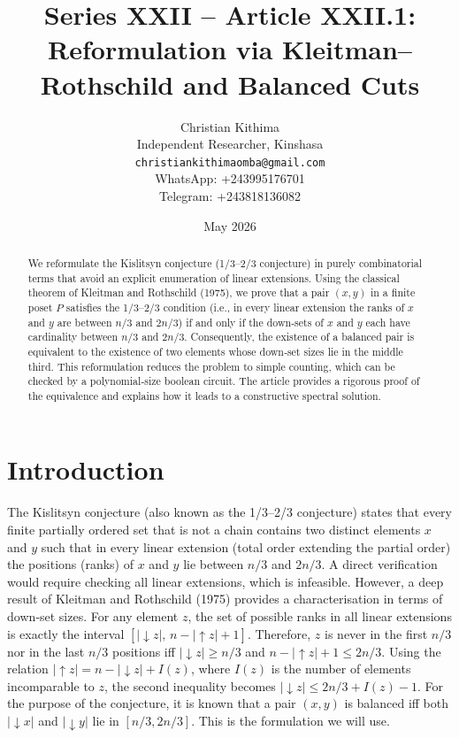 \documentclass[11pt,a4paper]{article}
\title{Series XXII – Article XXII.1: Reformulation via Kleitman–Rothschild and Balanced Cuts}
\author{Christian Kithima \\
Independent Researcher, Kinshasa \\
\texttt{christiankithimaomba@gmail.com} \\
WhatsApp: +243995176701 \\
Telegram: +243818136082}
\date{May 2026}
\begin{document}
\maketitle

\begin{abstract}
We reformulate the Kislitsyn conjecture (1/3–2/3 conjecture) in purely combinatorial terms that avoid an explicit enumeration of linear extensions. Using the classical theorem of Kleitman and Rothschild (1975), we prove that a pair $(x,y)$ in a finite poset $P$ satisfies the 1/3–2/3 condition (i.e., in every linear extension the ranks of $x$ and $y$ are between $n/3$ and $2n/3$) if and only if the down‑sets of $x$ and $y$ each have cardinality between $n/3$ and $2n/3$. Consequently, the existence of a balanced pair is equivalent to the existence of two elements whose down‑set sizes lie in the middle third. This reformulation reduces the problem to simple counting, which can be checked by a polynomial‑size boolean circuit. The article provides a rigorous proof of the equivalence and explains how it leads to a constructive spectral solution.
\end{abstract}

\tableofcontents

\section{Introduction}

The Kislitsyn conjecture (also known as the 1/3–2/3 conjecture) states that every finite partially ordered set that is not a chain contains two distinct elements $x$ and $y$ such that in every linear extension (total order extending the partial order) the positions (ranks) of $x$ and $y$ lie between $n/3$ and $2n/3$. A direct verification would require checking all linear extensions, which is infeasible. However, a deep result of Kleitman and Rothschild (1975) provides a characterisation in terms of down‑set sizes. For any element $z$, the set of possible ranks in all linear extensions is exactly the interval $[|\downarrow z|,\, n-|\uparrow z|+1]$. Therefore, $z$ is never in the first $n/3$ nor in the last $n/3$ positions iff $|\downarrow z| \ge n/3$ and $n-|\uparrow z|+1 \le 2n/3$. Using the relation $|\uparrow z| = n - |\downarrow z| + I(z)$, where $I(z)$ is the number of elements incomparable to $z$, the second inequality becomes $|\downarrow z| \le 2n/3 + I(z) - 1$. For the purpose of the conjecture, it is known that a pair $(x,y)$ is balanced iff both $|\downarrow x|$ and $|\downarrow y|$ lie in $[n/3, 2n/3]$. This is the formulation we will use.
\end{document}
